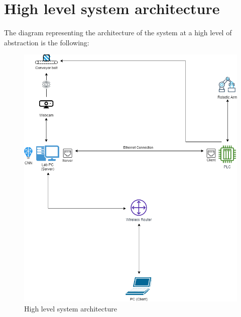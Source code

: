 \documentclass[a4paper,11pt]{report}
\theoremstyle{definition}
\theoremstyle{plain}
\begin{document}
        
    \section{High level system architecture}
        The diagram representing the architecture of the system at a high level of abstraction is the following:

        \begin{figure}[H] %
        \includegraphics[scale=0.5]{images/architecture.png}
        \centering
        \caption{High level system architecture}
        \end{figure}
\end{document}

